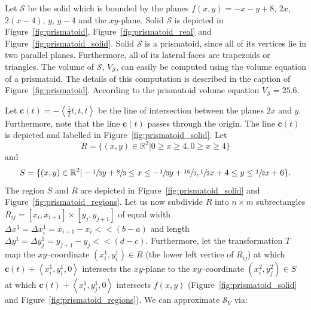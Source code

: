 \documentclass{article}
\theoremstyle{theorem}
\theoremstyle{definition}
\begin{document}
Let $\mathcal{S}$ be the solid which is bounded by the planes $f(x,y)=-x-y+8$, $2x$, $2(x-4)$, $y$, $y-4$ and the $xy$-plane. Solid $\mathcal{S}$ is depicted 
in Figure~\ref{fig:prismatoid}, Figure~\ref{fig:prismatoid_real} and Figure~\ref{fig:prismatoid_solid}. Solid $\mathcal{S}$ is a prismatoid, since all of its 
vertices lie in two parallel planes. Furthermore, all of its lateral faces are trapezoids or triangles. The volume of $\mathcal{S}$, $V_{\mathcal{S}}$, can easily be computed using the 
volume equation of a prismatoid. The details of this computation is described in the caption of Figure~\ref{fig:prismatoid}. According to the prismatoid volume 
equation $V_{\mathcal{S}}=25.6$.

Let $\mathbf{c}(t) = -\left<\frac{1}{2}t,t,t\right>$ be the line of intersection between the planes $2x$ and $y$. Furthermore, note that the line 
$\mathbf{c}(t)$ passes through the origin. The line $\mathbf{c}(t)$ is depicted and labelled in Figure~\ref{fig:prismatoid_solid}. Let 
\begin{equation}
R = \{(x,y)\in\mathbb{R}^2|0 \geq x \geq 4, 0 \geq x \geq 4\} \nonumber
\end{equation}
and
\begin{equation}
S = \{(x,y)\in\mathbb{R}^2|-\sfrac{1}{3}y+\sfrac{8}{3}\leq x\leq -\sfrac{1}{3}y+\sfrac{16}{3}, \sfrac{1}{2} x + 4\leq y \leq \sfrac{1}{2} x + 6 \}. \nonumber
\end{equation}
The region $S$ and $R$ are depicted in Figure~\ref{fig:prismatoid_solid} and Figure~\ref{fig:prismatoid_regions}. Let us now subdivide $R$ into $n\times m$
subrectangles $R_{ij} = [x_{i},x_{i+1}] \times [y_{j},y_{j+1}]$ of equal width $\Delta x^1 = \Delta x_i^1 = x_{i+1}-x_i<<(b-a)$ and length $\Delta y^1= \Delta y_j^1 = y_{j+1}-y_j<<(d-c)$. 
Furthermore, let the transformation $T$ map the $xy$--coordinate $(x_i^1,y_i^1)\in R$ (the lower left vertice of $R_{ij}$) at which $\mathbf{c}(t) + \left <x_i^1,y_i^1,0 \right >$ intersects the 
$xy$-plane to the $xy$--coordinate $(x_i^2,y_j^2)\in S$ at which $\mathbf{c}(t) + \left <x_i^1,y_j^1,0 \right >$ intersects $f(x,y)$ (Figure~\ref{fig:prismatoid_solid} and Figure~\ref{fig:prismatoid_regions}). 
We can approximate $\mathcal{S}_V$ via:
\end{document}
